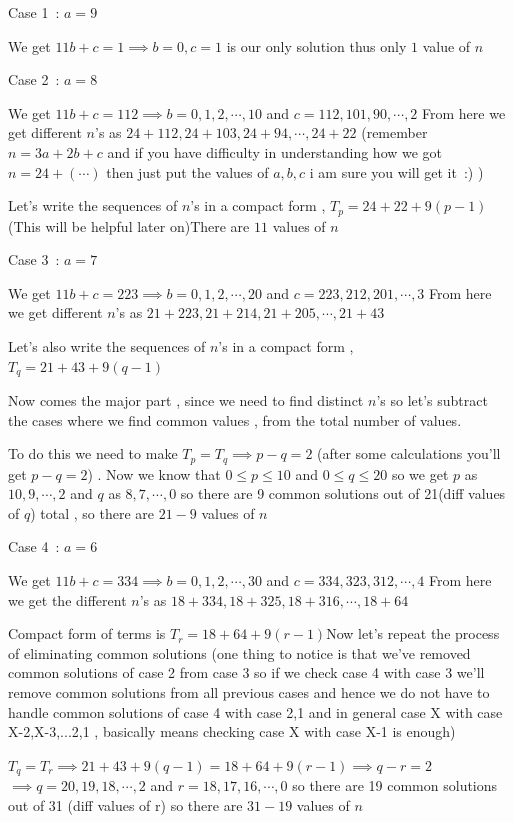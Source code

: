 \begin{enumerate}
 Case 1 : $a = 9$

 We get $11b + c = 1 \implies b = 0 , c = 1$ is our only solution thus only $\boxed{1}$ value of $n$

 Case 2 : $a = 8$

 We get $11b + c = 112 \implies b = 0,1,2,\cdots ,10$ and $c = 112 , 101 , 90,\cdots ,2$ From here we get different $n$'s as $24 + 112 , 24 + 103 , 24 + 94, \cdots ,24 + 22$  (remember $n = 3a + 2b + c$ and if you have difficulty in understanding how we got $n = 24 + (\cdots)$ then just put the values of $a,b,c$ i am sure you will get it :) )

 Let's write the sequences of $n$'s in a compact form , $T_p = 24 + 22 + 9(p-1)$ (This will be helpful later on)There are $\boxed{11}$ values of $n$

 Case 3 : $a = 7$

 We get $11b + c = 223 \implies b=0,1,2, \cdots ,20$ and $c = 223,212,201, \cdots ,3$ From here we get different $n$'s as $21 + 223, 21 + 214 , 21 + 205, \cdots ,21 + 43$

 Let's also write the sequences of $n$'s in a compact form , $T_q = 21 + 43 + 9(q-1)$

 Now comes the major part , since we need to find distinct $n$'s so let's subtract the cases where we find common values , from the total number of values.

 To do this we need to make $T_p = T_q \implies p - q = 2$ (after some calculations you'll get $p - q = 2$) . Now we know that $0 \le p \le 10$ and $0 \le q \le 20$ so we get $p$ as $10,9,\cdots,2$ and $q$ as $8,7,\cdots,0$ so there are 9 common solutions out of 21(diff values of $q$) total , so there are $\boxed{21 - 9}$ values of $n$

 Case 4 : $a = 6$

 We get $11b + c = 334 \implies b = 0,1,2, \cdots ,30$ and $c = 334,323,312, \cdots ,4$ From here we get the different $n$'s as $18 + 334,18 + 325,18 + 316, \cdots ,18 + 64$

 Compact form of terms is $T_r = 18 + 64 + 9(r-1)$Now let's repeat the process of eliminating common solutions (one thing to notice is that we've removed common solutions of case 2 from case 3 so if we check case 4 with case 3 we'll remove common solutions from all previous cases and hence we do not have to handle common solutions of case 4 with case 2,1 and in general case X with case X-2,X-3,...2,1 , {basically means checking case X with case X-1 is enough})

 $T_q = T_r \implies 21 + 43 + 9(q-1) = 18 + 64 + 9(r-1) \implies q - r = 2$$\implies q = 20,19,18, \cdots ,2$ and $r = 18,17,16, \cdots ,0$ so there are 19 common solutions out of 31 (diff values of r) so there are $\boxed{31 - 19}$ values of $n$


\end{enumerate}
